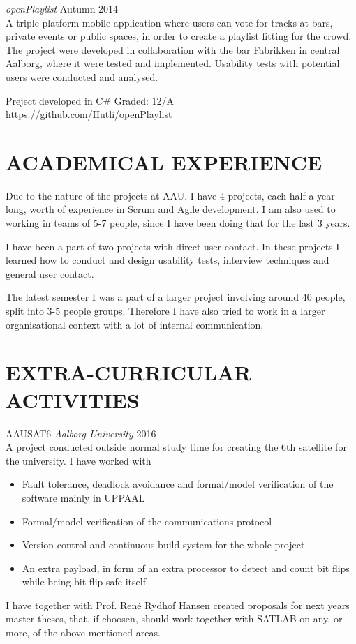 \documentclass[margin, 10pt]{res} %
\begin{document}
\begin{resume}
{\sl openPlaylist} \hfill Autumn 2014 \\
A triple-platform mobile application where users can vote for tracks at bars, private events or public spaces, in order to create a playlist fitting for the crowd. The project were developed in collaboration with the bar Fabrikken in central Aalborg, where it were tested and implemented. Usability tests with potential users were conducted and analysed.

Preject developed in C\# \hfill Graded: 12/A \\
\url{https://github.com/Hutli/openPlaylist}\\

\section{ACADEMICAL EXPERIENCE}

Due to the nature of the projects at AAU, I have 4 projects, each half a year long, worth of experience in Scrum and Agile development. I am also used to working in teams of 5-7 people, since I have been doing that for the last 3 years.

I have been a part of two projects with direct user contact. In these projects I learned how to conduct and design usability tests, interview techniques and general user contact.

The latest semester I was a part of a larger project involving around 40 people, split into 3-5 people groups. Therefore I have also tried to work in a larger organisational context with a lot of internal communication.


\section{EXTRA-CURRICULAR ACTIVITIES} 

AAUSAT6 {\it Aalborg University} \hfill 2016-- \\ 
A project conducted outside normal study time for creating the 6th satellite for the university. I have worked with
\begin{itemize}
\item Fault tolerance, deadlock avoidance and formal/model verification of the software mainly in UPPAAL
\item Formal/model verification of the communications protocol 
\item Version control and continuous build system for the whole project
\item An extra payload, in form of an extra processor to detect and count bit flips while being bit flip safe itself
\end{itemize}
I have together with Prof. René Rydhof Hansen created proposals for next years master theses, that, if choosen, should work together with SATLAB on any, or more, of the above mentioned areas.


\end{resume}
\end{document}
